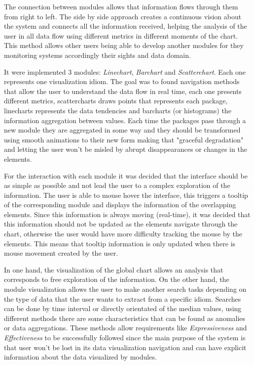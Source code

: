 \documentclass[letterpaper, 10 pt, conference]{ieeeconf}  %
\begin{document}
The connection between modules allows that information flows through them from right to left. The side by side approach creates a continuous vision about the system and connects all the information received, helping the analysis of the user in all data flow using different metrics in different moments of the chart. This method allows other users being able to develop another modules for they monitoring systems accordingly their sights and data domain.

It were implemented 3 modules: \textit{Linechart}, \textit{Barchart} and \textit{Scatterchart}. Each one represents one visualization idiom. The goal was to found navigation methods that allow the user to understand the data flow in real time, each one presents different metrics, scattercharts draws points that represents each package, linecharts represents the data tendencies and barcharts (or histograms) the information aggregation between values.
Each time the packages pass through a new module they are aggregated in some way and they should be transformed using smooth animations to their new form making that "graceful degradation" and letting the user won't be misled by abrupt disappearances or changes in the elements. 

For the interaction with each module it was decided that the interface should be as simple as possible and not lead the user to a complex exploration of the information. The user is able to mouse hover the interface, this triggers a tooltip of the corresponding module and displays the information of the overlapping elements. Since this information is always moving (real-time), it was decided that this information should not be updated as the elements navigate through the chart, otherwise the user would have more difficulty tracking the mouse by the elements. This means that tooltip information is only updated when there is mouse movement created by the user.

In one hand, the visualization of the global chart allows an analysis that corresponds to free exploration of the information. On the other hand, the module visualization allows the user to make another search tasks depending on the type of data that the user wants to extract from a specific idiom. Searches can be done by time interval or directly orientated of the median values, using different methods there are some characteristics that can be found as anomalies or data aggregations. \newline 
These methods allow requirements like \textit{Expressiveness} and \textit{Effectiveness} \cite{Mackinlay} to be successfully followed since the main purpose of the system is that user won't be lost in its data visualization navigation and can have explicit information about the data visualized by modules.
\end{document}
